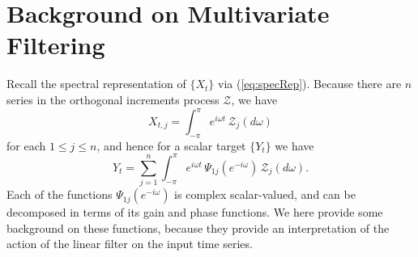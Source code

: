 \documentclass[a4paper]{book}
\begin{document}
\section{Background on Multivariate Filtering}

 Recall the spectral representation of $\{ X_t \}$ via (\ref{eq:specRep}).  Because 
 there are $n$ series in the orthogonal increments process $\mathcal{Z}$, we have
\[
  X_{t,j} = \int_{-\pi}^{\pi} e^{i \omega t} \, \mathcal{Z}_j (d\omega )
\] 
 for each $1 \leq j \leq n$, and hence for a scalar target $\{ Y_t \}$ we have
\begin{equation}
 \label{eq:spec-rep.partial}
  Y_t = \sum_{j=1}^n  \int_{-\pi}^{\pi} e^{i \omega  t} \, \Psi_{1 j} (e^{-i \omega }) \,
   \mathcal{Z}_j (d\omega ).
\end{equation}
  Each of the functions $\Psi_{1j} (e^{-i \omega })$ is complex scalar-valued, and
 can be decomposed in terms of its gain and phase functions.   We here provide some
 background on these functions, because they provide an interpretation of the action
 of the linear filter on the input time series.
\end{document}
